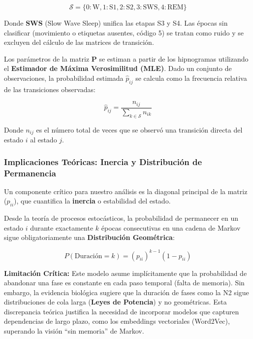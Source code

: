 \begin{equation}
    \mathcal{S} = \{0: \text{W}, 1: \text{S1}, 2: \text{S2}, 3: \text{SWS}, 4: \text{REM}\}
\end{equation}

Donde \textbf{SWS} (Slow Wave Sleep) unifica las etapas S3 y S4. Las épocas sin clasificar (movimiento o etiquetas ausentes, código 5) se tratan como ruido y se excluyen del cálculo de las matrices de transición.

Los parámetros de la matriz $\mathbf{P}$ se estiman a partir de los hipnogramas utilizando el \textbf{Estimador de Máxima Verosimilitud (MLE)}. Dado un conjunto de observaciones, la probabilidad estimada $\hat{p}_{ij}$ se calcula como la frecuencia relativa de las transiciones observadas:

\begin{equation}
    \hat{p}_{ij} = \frac{n_{ij}}{\sum_{k \in \mathcal{S}} n_{ik}}
\end{equation}

Donde $n_{ij}$ es el número total de veces que se observó una transición directa del estado $i$ al estado $j$.

\subsubsection{Implicaciones Teóricas: Inercia y Distribución de Permanencia}

Un componente crítico para nuestro análisis es la diagonal principal de la matriz ($p_{ii}$), que cuantifica la \textbf{inercia} o estabilidad del estado.

Desde la teoría de procesos estocásticos, la probabilidad de permanecer en un estado $i$ durante exactamente $k$ épocas consecutivas en una cadena de Markov sigue obligatoriamente una \textbf{Distribución Geométrica}:

\begin{equation}
    P(\text{Duración} = k) = (p_{ii})^{k-1} (1 - p_{ii})
\end{equation}

\textbf{Limitación Crítica:} Este modelo asume implícitamente que la probabilidad de abandonar una fase es constante en cada paso temporal (falta de memoria). Sin embargo, la evidencia biológica sugiere que la duración de fases como la N2 sigue distribuciones de cola larga (\textbf{Leyes de Potencia}) y no geométricas. Esta discrepancia teórica justifica la necesidad de incorporar modelos que capturen dependencias de largo plazo, como los embeddings vectoriales (Word2Vec), superando la visión ``sin memoria'' de Markov.

